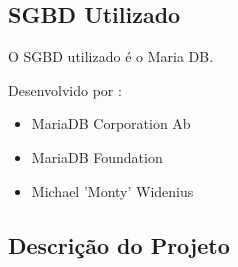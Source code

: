 \subsection{SGBD Utilizado}

O SGBD utilizado é o Maria DB.

Desenvolvido por :
\begin{itemize}
    \item MariaDB Corporation Ab
    \item MariaDB Foundation
    \item Michael 'Monty' Widenius
\end{itemize}

\subsection{Descrição do Projeto}

